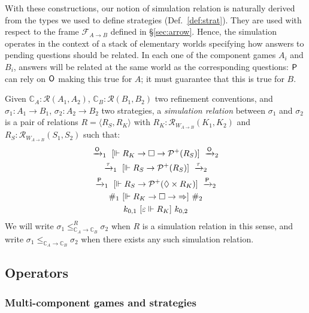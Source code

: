 With these constructions,
our notion of simulation relation
is naturally derived from
the types we used to define strategies (Def.~\ref{def:strat}).
They are used
with respect to the frame $\mathcal{F}_{A \rightarrow B}$
defined in \S\ref{sec:arrow}.
Hence, the simulation operates in the context of
a stack of elementary worlds
specifying how answers to pending questions
should be related.
In each one of the component games $A_i$ and $B_i$,
answers will be related at the same world as the corresponding questions:
$ \mathsf{P} $ can rely on $ \mathsf{O} $ making this true for $A$;
it must guarantee that this is true for $B$.

\begin{definition} %
Given
$\mathbb{C}_A : \mathcal{R}(A_1, A_2)$,
$\mathbb{C}_B : \mathcal{R}(B_1, B_2)$
two refinement conventions, and
$\sigma_1 : A_1 \rightarrow B_1$,
$\sigma_2 : A_2 \rightarrow B_2$
two strategies,
a \emph{simulation relation} between $\sigma_1$ and $\sigma_2$
is a pair of relations $R = \langle R_S, R_K \rangle$ with
$R_K : \mathcal{R}_{W_{\!A \rightarrow B}}(K_1, K_2)$ and
$R_S : \mathcal{R}_{W_{\!A \rightarrow B}}(S_1, S_2)$
such that:
\begin{gather*}
  \xrightarrow{ \mathsf{O} }_1
  \ [{\Vdash R_K \rightarrow \Box \rightarrow \mathcal{P}^+(R_S)}]\ 
  \xrightarrow{ \mathsf{O} }_2
  \\
  \xrightarrow{\tau}_1
  \ [{\Vdash R_S \rightarrow \mathcal{P}^+(R_S)}]\ 
  \xrightarrow{\tau}_2
  \\
  \xrightarrow{ \mathsf{P} }_1
  \ [{\Vdash R_S \rightarrow \mathcal{P}^+(\Diamond \times R_K)}]\ 
  \xrightarrow{ \mathsf{P} }_2
  \\
  \#_1
  \ [{\Vdash R_K \rightarrow \Box \rightarrow {\Rightarrow}}]\ 
  \#_2
  \\
  k_{0,1} \ [{\varepsilon \Vdash R_K}]\  k_{0,2}
\end{gather*}
We will write
$\sigma_1 \le_{\mathbb{C}_A \rightarrow \mathbb{C}_B}^R \sigma_2$
when $R$ is a simulation relation in this sense, and write
$\sigma_1 \le_{\mathbb{C}_A \rightarrow \mathbb{C}_B} \sigma_2$
when there exists any such simulation relation.
\end{definition}


\subsection{Operators} %

\subsubsection{Multi-component games and strategies} %

